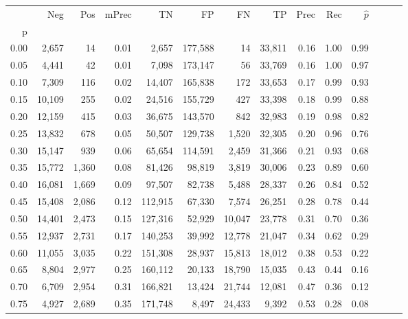 \begin{tabular}{rrrrrrrrrrrrrr}
\toprule
{} &     Neg &    Pos & mPrec &       TN &       FP &      FN &      TP &  Prec &   Rec & $\hat{p}$ \\
p    &         &        &       &          &          &         &         &       &       &           \\
\midrule
0.00 &   2,657 &     14 &  0.01 &    2,657 &  177,588 &      14 &  33,811 &  0.16 &  1.00 &      0.99 \\
0.05 &   4,441 &     42 &  0.01 &    7,098 &  173,147 &      56 &  33,769 &  0.16 &  1.00 &      0.97 \\
0.10 &   7,309 &    116 &  0.02 &   14,407 &  165,838 &     172 &  33,653 &  0.17 &  0.99 &      0.93 \\
0.15 &  10,109 &    255 &  0.02 &   24,516 &  155,729 &     427 &  33,398 &  0.18 &  0.99 &      0.88 \\
0.20 &  12,159 &    415 &  0.03 &   36,675 &  143,570 &     842 &  32,983 &  0.19 &  0.98 &      0.82 \\
0.25 &  13,832 &    678 &  0.05 &   50,507 &  129,738 &   1,520 &  32,305 &  0.20 &  0.96 &      0.76 \\
0.30 &  15,147 &    939 &  0.06 &   65,654 &  114,591 &   2,459 &  31,366 &  0.21 &  0.93 &      0.68 \\
0.35 &  15,772 &  1,360 &  0.08 &   81,426 &   98,819 &   3,819 &  30,006 &  0.23 &  0.89 &      0.60 \\
0.40 &  16,081 &  1,669 &  0.09 &   97,507 &   82,738 &   5,488 &  28,337 &  0.26 &  0.84 &      0.52 \\
0.45 &  15,408 &  2,086 &  0.12 &  112,915 &   67,330 &   7,574 &  26,251 &  0.28 &  0.78 &      0.44 \\
0.50 &  14,401 &  2,473 &  0.15 &  127,316 &   52,929 &  10,047 &  23,778 &  0.31 &  0.70 &      0.36 \\
0.55 &  12,937 &  2,731 &  0.17 &  140,253 &   39,992 &  12,778 &  21,047 &  0.34 &  0.62 &      0.29 \\
0.60 &  11,055 &  3,035 &  0.22 &  151,308 &   28,937 &  15,813 &  18,012 &  0.38 &  0.53 &      0.22 \\
0.65 &   8,804 &  2,977 &  0.25 &  160,112 &   20,133 &  18,790 &  15,035 &  0.43 &  0.44 &      0.16 \\
0.70 &   6,709 &  2,954 &  0.31 &  166,821 &   13,424 &  21,744 &  12,081 &  0.47 &  0.36 &      0.12 \\
0.75 &   4,927 &  2,689 &  0.35 &  171,748 &    8,497 &  24,433 &   9,392 &  0.53 &  0.28 &      0.08 \\

\end{tabular}
